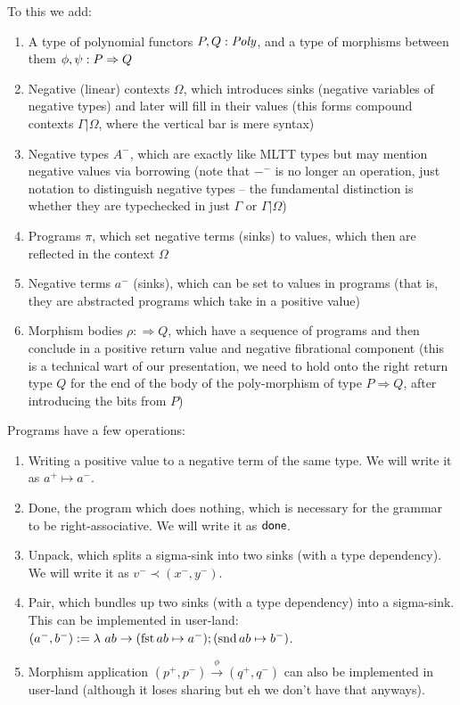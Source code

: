 \documentclass[final]{amsart}
\begin{document}
To this we add:
\begin{enumerate}
  \item A type of polynomial functors $P, Q : \mathit{Poly}$, and a type of morphisms between them $\phi, \psi : P \Rightarrow Q$
  \item Negative (linear) contexts $\Omega$, which introduces sinks (negative variables of negative types) and later will fill in their values (this forms compound contexts $\Gamma | \Omega$, where the vertical bar is mere syntax)
  \item Negative types $A^{-}$, which are exactly like MLTT types but may mention negative values via borrowing (note that ${-}^{-}$ is no longer an operation, just notation to distinguish negative types -- the fundamental distinction is whether they are typechecked in just $\Gamma$ or $\Gamma | \Omega$)
  \item Programs $\pi$, which set negative terms (sinks) to values, which then are reflected in the context $\Omega$
  \item Negative terms $a^{-}$ (sinks), which can be set to values in programs (that is, they are abstracted programs which take in a positive value)
  \item Morphism bodies $\rho :\Rightarrow Q$, which have a sequence of programs and then conclude in a positive return value and negative fibrational component (this is a technical wart of our presentation, we need to hold onto the right return type $Q$ for the end of the body of the poly-morphism of type $P \Rightarrow Q$, after introducing the bits from $P$)
\end{enumerate}

Programs have a few operations:
\begin{enumerate}
  \item Writing a positive value to a negative term of the same type. We will write it as $a^{+} \mapsto a^{-}$.
  \item Done, the program which does nothing, which is necessary for the grammar to be right-associative. We will write it as $\mathsf{done}$.
  \item Unpack, which splits a sigma-sink into two sinks (with a type dependency). We will write it as $v^{-} \prec (x^{-}, y^{-})$.
  \item Pair, which bundles up two sinks (with a type dependency) into a sigma-sink. This can be implemented in user-land: $(a^{-}, b^{-}) := \lambda\ ab \to (\operatorname{fst} ab \mapsto a^{-}); (\operatorname{snd} ab \mapsto b^{-})$.
  \item Morphism application $(p^{+}, p^{-}) \xrightarrow{\phi} (q^{+}, q^{-})$ can also be implemented in user-land (although it loses sharing but eh we don't have that anyways).
\end{enumerate}
\end{document}
